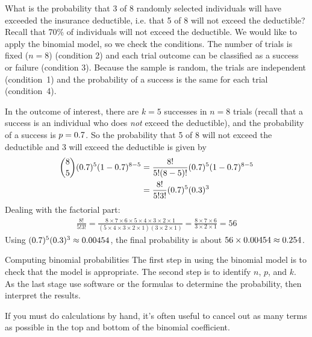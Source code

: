 \begin{examplewrap}
\begin{nexample}{What is the probability that 3 of 8 randomly
    selected individuals will have exceeded the insurance
    deductible, i.e. that 5 of 8 will not exceed the deductible?
    Recall that 70\% of individuals will not exceed the
    deductible.}
  We would like to apply the binomial model,
  so we check the conditions.
  The number of trials is fixed ($n = 8$) (condition 2)
  and each trial outcome can be classified as a success
  or failure (condition 3).
  Because the sample is random, the trials are independent
  (condition~1) and the probability of a success is the same
  for each trial (condition~4).

  In the outcome of interest, there are $k = 5$ successes
  in $n = 8$ trials (recall that a success is an individual
  who does \emph{not} exceed the deductible), and the
  probability of a success is $p = 0.7{}$.
  So the probability that 5 of 8 will not exceed the
  deductible and 3 will exceed the deductible is given by
  \begin{align*}
  { 8 \choose 5}(0.7{})^5
  (1-0.7{})^{8-5}
    &= \frac{8!}{5!(8-5)!}
        (0.7{})^5(1-0.7{})^{8-5} \\
    &= \frac{8!}{5!3!}
        (0.7{})^5(0.3{})^3
  \end{align*}
  Dealing with the factorial part:
  \begin{align*}
  \frac{8!}{5!3!}
    = \frac{8\times7\times6\times5\times4\times3\times2\times1}
        {(5\times4\times3\times2\times1)(3\times2\times1)}
    = \frac{8\times7\times6}{3\times2\times1}
    = 56
  \end{align*}
  Using $(0.7{})^5(0.3{})^3
    \approx 0.00454{}$,
  the final probability is about
  $56 \times 0.00454{}
    \approx 0.254{}$.
\end{nexample}
\end{examplewrap}

\begin{onebox}{Computing binomial probabilities}
  The first step in using the binomial model is to check
  that the model is appropriate.
  The second step is to identify $n$, $p$, and $k$.
  As the last stage use software or the formulas
  to determine the probability, then interpret the results.%
  \vspace{3mm}

  If you must do calculations by hand, it's often useful
  to cancel out as many terms as possible in the top and
  bottom of the binomial coefficient.
\end{onebox}

